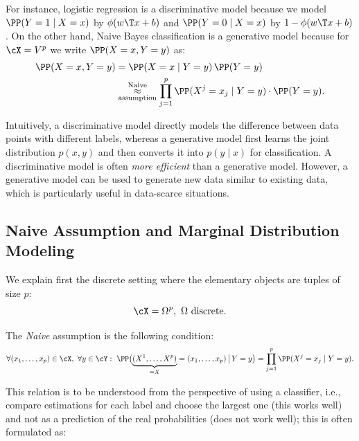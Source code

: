 For instance, logistic regression is a discriminative model because we model
$\PP(Y=1\mid X=x)$ by $\phi(w\T x+b)$ and $\PP(Y=0\mid X=x)$ by
$1-\phi(w\T x+b)$. On the other hand, Naive Bayes classification is a
generative model because for $\cX=V^{p}$ we write $\PP(X=x,Y=y)$ as:
\begin{align}
  \PP(X=x,Y=y) &= \PP(X=x\mid Y=y)\,\PP(Y=y)\nonumber\\
               &\underset{\text{assumption}}{\overset{\text{Naive}}{\approx}}
                 \prod_{j=1}^{p}\PP(X^{j}=x_{j}\mid Y=y)\cdot\PP(Y=y).
  \label{eq:ch6-nb-joint}
\end{align}

Intuitively, a discriminative model directly models the difference between
data points with different labels, whereas a generative model first learns the
joint distribution $p(x,y)$ and then converts it into $p(y\mid x)$ for
classification. A discriminative model is often \emph{more efficient} than a
generative model. However, a generative model can be used to generate new data
similar to existing data, which is particularly useful in data-scarce
situations.

\subsection{Naive Assumption and Marginal Distribution Modeling}
\label{subsec:ch6-naive-marginals}

We explain first the discrete setting where the elementary objects are tuples
of size $p$:
\begin{equation}\label{eq:ch6-discrete-setting}
  \cX=\Omega^{p},\ \Omega\ \text{discrete}.
\end{equation}

The \emph{Naive} assumption is the following condition:
\begin{equation}\label{eq:ch6-naive-assumption}
  \forall (x_{1},\dots,x_{p})\in\cX,\ \forall y\in\cY:\
  \PP\bigl(\underbrace{(X^{1},\dots,X^{p})}_{=X}=(x_{1},\dots,x_{p})\,\big|\,Y=y\bigr)
  =\prod_{j=1}^{p}\PP(X^{j}=x_{j}\mid Y=y).
\end{equation}

\begin{warning}
This relation is to be understood from the perspective
of using a classifier, i.e., compare estimations for each label and choose
the largest one (this works well) and not as a prediction of the real
probabilities (does not work well); this is often formulated as:
\begin{center}
\end{center}
\end{warning}

